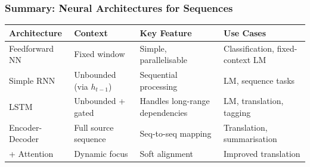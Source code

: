 \bigseparator

\subsubsection{Summary: Neural Architectures for Sequences}

\begin{center}
\renewcommand{\arraystretch}{1.3}
\begin{tabular}{@{} l p{3cm} p{3cm} p{4cm} @{}}
\toprule
\textbf{Architecture} & \textbf{Context} & \textbf{Key Feature} & \textbf{Use Cases} \\
\midrule
Feedforward NN & Fixed window & Simple, parallelisable & Classification, fixed-context LM \\
Simple RNN & Unbounded (via $h_{t-1}$) & Sequential processing & LM, sequence tasks \\
LSTM & Unbounded + gated & Handles long-range dependencies & LM, translation, tagging \\
Encoder-Decoder & Full source sequence & Seq-to-seq mapping & Translation, summarisation \\
+ Attention & Dynamic focus & Soft alignment & Improved translation \\
\bottomrule
\end{tabular}
\end{center}

